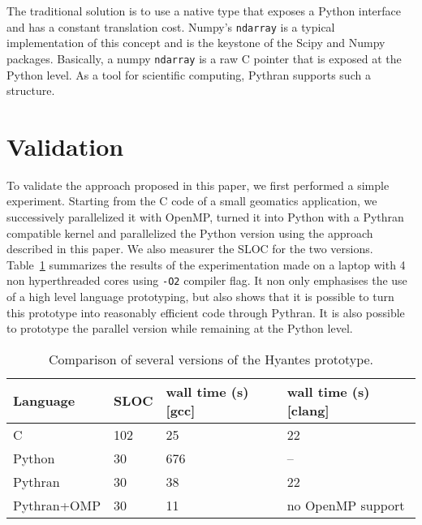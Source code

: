 \documentclass{llncs}
\begin{document}
The traditional solution is to use a native type that exposes a Python interface
and has a constant translation cost. Numpy's \texttt{ndarray} is a typical
implementation of this concept and is the keystone of the Scipy and Numpy
packages. Basically, a numpy \texttt{ndarray} is a raw C pointer that is exposed
at the Python level. As a tool for scientific computing, Pythran supports such a
structure.

\section{Validation}\label{sec:validation}

To validate the approach proposed in this paper, we first performed a simple
experiment. Starting from the C code of a small geomatics application, we
successively parallelized it with OpenMP, turned it into Python with a Pythran
compatible kernel and parallelized the Python version using the approach
described in this paper. We also measurer the SLOC for the two versions.
Table~\ref{tbl:hyantes} summarizes the results of the experimentation made on a
laptop with 4 non hyperthreaded cores using \texttt{-O2} compiler flag. It
non only emphasises the use of a high level language prototyping, but also shows
that it is possible to turn this prototype into reasonably efficient code
through Pythran. It is also possible to prototype the parallel version while
remaining at the Python level.

\begin{table}

    \centering
    \begin{tabular}{|l|l|l|l|}
        \hline
        Language & SLOC & wall time (s) [gcc] & wall time (s) [clang]\\
        \hline
        C       & 102   & 25 & 22 \\
        Python  & 30    & 676 & --\\
        Pythran & 30    & 38 &  22 \\
        Pythran+OMP    & 30    & 11 & no OpenMP support\\
        \hline
    \end{tabular}

    \caption{Comparison of several versions of the Hyantes prototype.}
    \label{tbl:hyantes}

\end{table}
\end{document}
